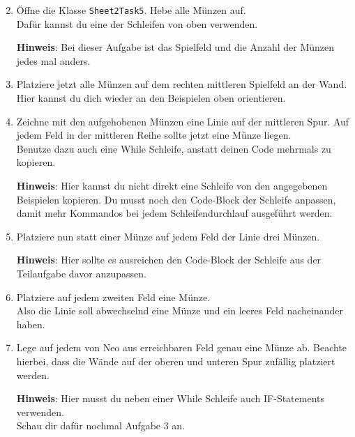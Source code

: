 \begin{enumerate} \setcounter{enumi}{1}
    \item Öffne die Klasse \lstinline{Sheet2Task5}.
        Hebe alle Münzen auf.\\
        Dafür kannst du eine der Schleifen von oben verwenden.

    \textbf{Hinweis}: Bei dieser Aufgabe ist das Spielfeld und die Anzahl der Münzen jedes mal anders.
    \item Platziere jetzt alle Münzen auf dem rechten mittleren Spielfeld an der Wand. 
        Hier kannst du dich wieder an den Beispielen oben orientieren.
    \item Zeichne mit den aufgehobenen Münzen eine Linie auf der mittleren Spur. 
        Auf jedem Feld in der mittleren Reihe sollte jetzt eine Münze liegen.\\
        Benutze dazu auch eine While Schleife, anstatt deinen Code mehrmals zu kopieren.

    \textbf{Hinweis}: Hier kannst du nicht direkt eine Schleife von den angegebenen Beispielen kopieren.
        Du musst noch den Code-Block der Schleife anpassen, damit mehr Kommandos bei jedem Schleifendurchlauf ausgeführt werden.
    \item Platziere nun statt einer Münze auf jedem Feld der Linie drei Münzen.

    \textbf{Hinweis}: Hier sollte es ausreichen den Code-Block der Schleife aus der Teilaufgabe davor anzupassen.
    \item Platziere auf jedem zweiten Feld eine Münze.\\
        Also die Linie soll abwechselnd eine Münze und ein leeres Feld nacheinander haben.
    \item \optional Lege auf jedem von Neo aus erreichbaren Feld genau eine Münze ab. 
        Beachte hierbei, dass die Wände auf der oberen und unteren Spur zufällig platziert werden.

    \textbf{Hinweis}: Hier musst du neben einer While Schleife auch IF-Statements verwenden.\\
        Schau dir dafür nochmal Aufgabe 3 an.
\end{enumerate}
